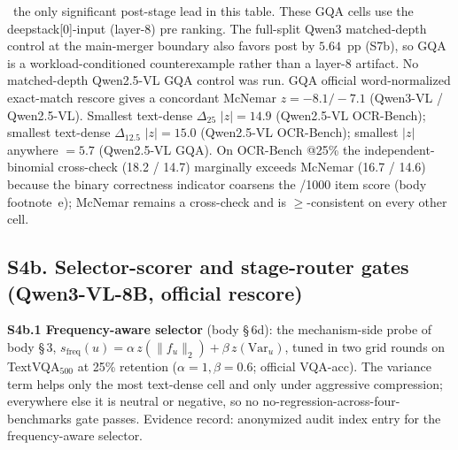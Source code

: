 \noindent\dag\ the only significant post-stage lead in this table. These GQA
cells use the deepstack[0]-input (layer-8) pre ranking. The full-split Qwen3
matched-depth control at the main-merger boundary also favors post by
$5.64$~pp (S7b), so GQA is a workload-conditioned counterexample rather than
a layer-8 artifact. No matched-depth Qwen2.5-VL GQA control was run. GQA official
word-normalized exact-match rescore gives a concordant McNemar $z = -8.1 / -7.1$
(Qwen3-VL / Qwen2.5-VL). Smallest text-dense $\Delta_{25}$ $|z| = 14.9$
(Qwen2.5-VL OCR-Bench); smallest text-dense $\Delta_{12.5}$ $|z| = 15.0$
(Qwen2.5-VL OCR-Bench); smallest $|z|$ anywhere $= 5.7$ (Qwen2.5-VL GQA). On
OCR-Bench @25\% the independent-binomial cross-check (18.2 / 14.7) marginally
exceeds McNemar (16.7 / 14.6) because the binary correctness indicator coarsens
the /1000 item score (body footnote~e); McNemar remains a cross-check and is
$\geq$-consistent on every other cell.

\subsection*{S4b. Selector-scorer and stage-router gates (Qwen3-VL-8B, official rescore)}

\noindent\textbf{S4b.1 Frequency-aware selector} (body \S\,6d): the
mechanism-side probe of body \S\,3, $s_{\mathrm{freq}}(u) = \alpha\,
z(\|f_u\|_2) + \beta\, z(\mathrm{Var}_u)$, tuned in two grid rounds on
TextVQA$_{500}$ at 25\% retention ($\alpha{=}1,\beta{=}0.6$; official VQA-acc).
The variance term helps only the most text-dense cell and only under aggressive
compression; everywhere else it is neutral or negative, so no
no-regression-across-four-benchmarks gate passes. Evidence record: anonymized
audit index entry for the frequency-aware selector.

